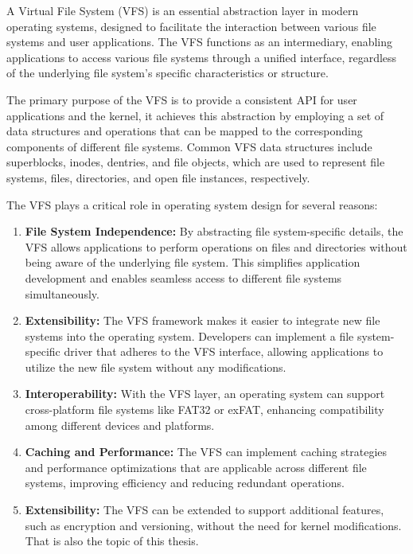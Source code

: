 A Virtual File System (VFS) is an essential abstraction layer in modern operating systems, designed to facilitate the interaction between various file systems and user applications.
The VFS functions as an intermediary, enabling applications to access various file systems through a unified interface, regardless of the underlying file system's specific characteristics or structure.

The primary purpose of the VFS is to provide a consistent API for user applications and the kernel, it achieves this abstraction by employing a set of data structures and operations that can be mapped to the corresponding components of different file systems.
Common VFS data structures include superblocks, inodes, dentries, and file objects, which are used to represent file systems, files, directories, and open file instances, respectively.

The VFS plays a critical role in operating system design for several reasons:

\begin{enumerate}
    \item \textbf{File System Independence:} By abstracting file system-specific details, the VFS allows applications to perform operations on files and directories without being aware of the underlying file system.
    This simplifies application development and enables seamless access to different file systems simultaneously.
    \item \textbf{Extensibility:} The VFS framework makes it easier to integrate new file systems into the operating system.
    Developers can implement a file system-specific driver that adheres to the VFS interface, allowing applications to utilize the new file system without any modifications.
    \item \textbf{Interoperability:} With the VFS layer, an operating system can support cross-platform file systems like FAT32 or exFAT, enhancing compatibility among different devices and platforms.
    \item \textbf{Caching and Performance:} The VFS can implement caching strategies and performance optimizations that are applicable across different file systems, improving efficiency and reducing redundant operations.
    \item \textbf{Extensibility:} The VFS can be extended to support additional features, such as encryption and versioning, without the need for kernel modifications.
    That is also the topic of this thesis.
\end{enumerate}


